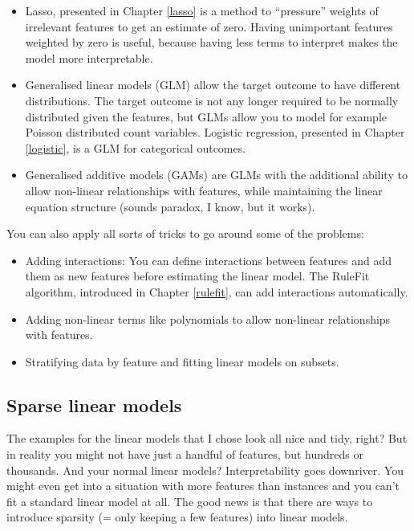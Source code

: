 \documentclass[12pt,]{krantz}
\providecommand{\tightlist}{%
  \setlength{\itemsep}{0pt}\setlength{\parskip}{0pt}}
\theoremstyle{definition}
\theoremstyle{definition}
\theoremstyle{definition}
\theoremstyle{remark}
\begin{document}
\begin{itemize}
\tightlist
\item
  Lasso, presented in Chapter \ref{lasso} is a method to ``pressure''
  weights of irrelevant features to get an estimate of zero. Having
  unimportant features weighted by zero is useful, because having less
  terms to interpret makes the model more interpretable.
\item
  Generalised linear models (GLM) allow the target outcome to have
  different distributions. The target outcome is not any longer required
  to be normally distributed given the features, but GLMs allow you to
  model for example Poisson distributed count variables. Logistic
  regression, presented in Chapter \ref{logistic}, is a GLM for
  categorical outcomes.
\item
  Generalised additive models (GAMs) are GLMs with the additional
  ability to allow non-linear relationships with features, while
  maintaining the linear equation structure (sounds paradox, I know, but
  it works).
\end{itemize}

You can also apply all sorts of tricks to go around some of the
problems:

\begin{itemize}
\tightlist
\item
  Adding interactions: You can define interactions between features and
  add them as new features before estimating the linear model. The
  RuleFit algorithm, introduced in Chapter \ref{rulefit}, can add
  interactions automatically.
\item
  Adding non-linear terms like polynomials to allow non-linear
  relationships with features.
\item
  Stratifying data by feature and fitting linear models on subsets.
\end{itemize}

\subsection{Sparse linear models}\label{sparse-linear}

The examples for the linear models that I chose look all nice and tidy,
right? But in reality you might not have just a handful of features, but
hundreds or thousands. And your normal linear models? Interpretability
goes downriver. You might even get into a situation with more features
than instances and you can't fit a standard linear model at all. The
good news is that there are ways to introduce sparsity (= only keeping a
few features) into linear models.
\end{document}
